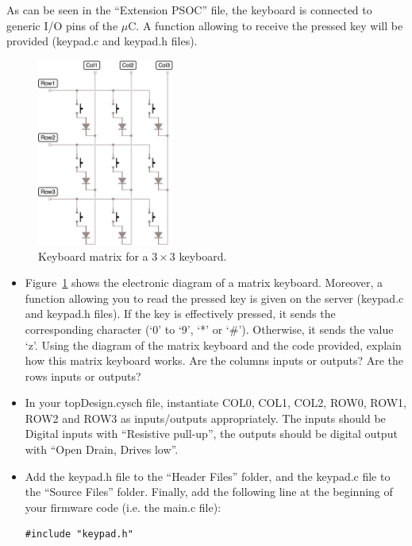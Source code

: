 \documentclass[11pt,a4paper]{article}
\theoremstyle{definition}%
\begin{document}
As can be seen in the ``Extension PSOC'' file, the keyboard is connected to generic I/O pins of the $\mu$C.
A function allowing to receive the pressed key will be provided (keypad.c and keypad.h files).

\begin{figure}[H]
\center
\includegraphics[width=0.4\textwidth]{keyboard_matrix}
\caption{Keyboard matrix for a $3\times 3$ keyboard.}
\label{fig:keyboard_matrix}
\end{figure}

\begin{itemize}
	\item Figure~\ref{fig:keyboard_matrix} shows the electronic diagram of a matrix keyboard. Moreover, a function allowing you to read the pressed key is given on the server (keypad.c and keypad.h files). If the key is effectively pressed, it sends the corresponding character (‘0’ to ‘9’, ‘*’ or ‘\#’).	Otherwise, it sends the value ‘z’. Using the diagram of the matrix keyboard and the code provided, explain how this matrix keyboard works. Are the columns inputs or outputs? Are the rows inputs or outputs? 
	\item In your topDesign.cysch file, instantiate COL0, COL1, COL2, ROW0, ROW1, ROW2 and ROW3 as inputs/outputs appropriately. The inputs should be Digital inputs with ``Resistive pull-up'', the outputs should be digital output with ``Open Drain, Drives low''. 
	\item Add the keypad.h file to the ``Header Files'' folder, and the keypad.c file to the ``Source Files'' folder. Finally, add the following line at the beginning of your firmware code (i.e. the main.c file): 
\begin{lstlisting}[style=CStyle]
#include "keypad.h"	
\end{lstlisting}
\end{itemize}
\end{document}
